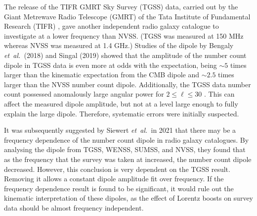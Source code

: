 \documentclass[a4paper,12pt]{report}
\newcommand{\etal}{\emph{et~al.\ }}
\begin{document}
The release of the TIFR GMRT Sky Survey (TGSS) data, carried out by the Giant Metrewave Radio Telescope (GMRT) of the Tata Institute of Fundamental Research (TIFR) \cite{RN92}, gave another independent radio galaxy catalogue to investigate at a lower frequency than NVSS. (TGSS was measured at 150 MHz whereas NVSS was measured at 1.4 GHz.) Studies of the dipole by Bengaly \etal (2018) \cite{RN85} and Singal (2019) \cite{RN33} showed that the amplitude of the number count dipole in TGSS data is even more at odds with the expectation, being $\sim 5$ times larger than the kinematic expectation from the CMB dipole and $\sim 2.5$ times larger than the NVSS number count dipole. Additionally, the TGSS data number count possessed anomalously large angular power for $2 \leq \ell \leq 30$ \cite{RN85,RN174}. This can affect the measured dipole amplitude, but not at a level large enough to fully explain the large dipole. Therefore, systematic errors were initially suspected.

It was subsequently suggested by Siewert \etal in 2021 \cite{RN86} that there may be a frequency dependence of the number count dipole in radio galaxy catalogues. By analysing the dipole from TGSS, WENSS, SUMSS, and NVSS, they found that as the frequency that the survey was taken at increased, the number count dipole decreased. However, this conclusion is very dependent on the TGSS result. Removing it allows a constant dipole amplitude fit over frequency. If the frequency dependence result is found to be significant, it would rule out the kinematic interpretation of these dipoles, as the effect of Lorentz boosts on survey data should be almost frequency independent.
\end{document}
